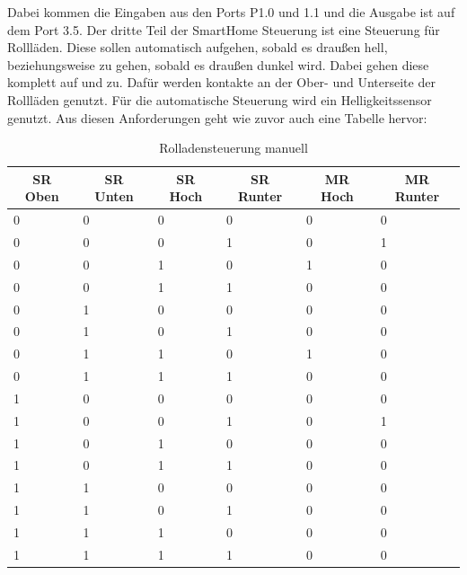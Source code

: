 Dabei kommen die Eingaben aus den Ports P1.0 und 1.1 und die Ausgabe ist auf dem Port 3.5.
Der dritte Teil der SmartHome Steuerung ist eine Steuerung für Rollläden. Diese sollen automatisch aufgehen, sobald es draußen hell, beziehungsweise zu gehen, sobald es draußen dunkel wird. Dabei gehen diese komplett auf und zu. Dafür werden kontakte an der Ober- und Unterseite der Rollläden genutzt. Für die automatische Steuerung wird ein Helligkeitssensor genutzt.
Aus diesen Anforderungen geht wie zuvor auch eine Tabelle hervor:

\begin{table}[]
\centering
\caption{Rolladensteuerung manuell}
\label{my-label}
\begin{tabular}{|l|l|l|l|l|l|}
\hline
\multicolumn{1}{|c|}{\textbf{SR Oben}} & \multicolumn{1}{c|}{\textbf{SR Unten}} & \multicolumn{1}{c|}{\textbf{SR Hoch}} & \multicolumn{1}{c|}{\textbf{SR Runter}} & \multicolumn{1}{c|}{\textbf{MR Hoch}} & \multicolumn{1}{c|}{\textbf{MR Runter}} \\ \hline
 0 & 0 & 0 & 0 & 0 & 0 \\ \hline
 0 & 0 & 0 & 1 & 0 & 1 \\ \hline
 0 & 0 & 1 & 0 & 1 & 0 \\ \hline
 0 & 0 & 1 & 1 & 0 & 0 \\ \hline
 0 & 1 & 0 & 0 & 0 & 0 \\ \hline
 0 & 1 & 0 & 1 & 0 & 0 \\ \hline
 0 & 1 & 1 & 0 & 1 & 0 \\ \hline
 0 & 1 & 1 & 1 & 0 & 0 \\ \hline
 1 & 0 & 0 & 0 & 0 & 0 \\ \hline
 1 & 0 & 0 & 1 & 0 & 1 \\ \hline
 1 & 0 & 1 & 0 & 0 & 0 \\ \hline
 1 & 0 & 1 & 1 & 0 & 0 \\ \hline
 1 & 1 & 0 & 0 & 0 & 0 \\ \hline
 1 & 1 & 0 & 1 & 0 & 0 \\ \hline
 1 & 1 & 1 & 0 & 0 & 0 \\ \hline
 1 & 1 & 1 & 1 & 0 & 0 \\ \hline
\end{tabular}
\end{table}


